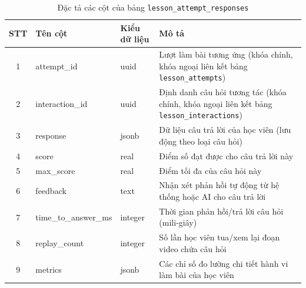 \documentclass[../DoAn.tex]{subfiles}
\begin{document}
\begin{table}[H]
\centering
\small
\renewcommand{\arraystretch}{1.3}
\begin{tabular}{|c|l|l|p{6.2cm}|}
\hline
\textbf{STT} & \textbf{Tên cột} & \textbf{Kiểu dữ liệu} & \textbf{Mô tả} \\ \hline
1 & attempt\_id & uuid & Lượt làm bài tương ứng (khóa chính, khóa ngoại liên kết bảng \texttt{lesson\_attempts}) \\ \hline
2 & interaction\_id & uuid & Định danh câu hỏi tương tác (khóa chính, khóa ngoại liên kết bảng \texttt{lesson\_interactions}) \\ \hline
3 & response & jsonb & Dữ liệu câu trả lời của học viên (lưu động theo loại câu hỏi) \\ \hline
4 & score & real & Điểm số đạt được cho câu trả lời này \\ \hline
5 & max\_score & real & Điểm tối đa của câu hỏi này \\ \hline
6 & feedback & text & Nhận xét phản hồi tự động từ hệ thống hoặc AI cho câu trả lời \\ \hline
7 & time\_to\_answer\_ms & integer & Thời gian phản hồi/trả lời câu hỏi (mili-giây) \\ \hline
8 & replay\_count & integer & Số lần học viên tua/xem lại đoạn video chứa câu hỏi \\ \hline
9 & metrics & jsonb & Các chỉ số đo lường chi tiết hành vi làm bài của học viên \\ \hline
\end{tabular}
\caption{Đặc tả các cột của bảng \texttt{lesson\_attempt\_responses}}
\label{tbl:lesson_attempt_responses}
\end{table}
\end{document}
